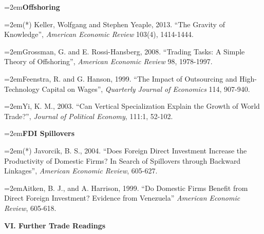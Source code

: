 \documentclass[10pt]{article}
\newcommand{\reading}{\par\hangindent=2em\hangafter=1\noindent}
\newenvironment{readingsblock}{%
  \begin{adjustwidth}{2em}{0pt} %
}{%
  \end{adjustwidth}
}
\begin{document}
\begin{readingsblock}
  \reading \textbf{Offshoring} \\[4pt]
  
  \reading (*) Keller, Wolfgang and Stephen Yeaple, 2013. “The Gravity of Knowledge”, {\it American Economic Review} 103(4), 1414-1444.
  \reading Grossman, G. and E. Rossi-Hansberg, 2008. “Trading Tasks: A Simple Theory of Offshoring”, {\it American Economic Review} 98, 1978-1997.
  \reading Feenstra, R. and G. Hanson, 1999. “The Impact of Outsourcing and High-Technology Capital on Wages”, {\it Quarterly Journal of Economics} 114, 907-940.
  \reading Yi, K. M., 2003. “Can Vertical Specialization Explain the Growth of World Trade?”, {\it Journal of Political Economy}, 111:1, 52-102. \\[4pt]
  
  
  \reading \textbf{FDI Spillovers} \\[4pt]
  
  \reading (*) Javorcik, B. S., 2004. “Does Foreign Direct Investment Increase the Productivity of Domestic Firms? In Search of Spillovers through Backward Linkages”, {\it American Economic Review}, 605-627.
  \reading Aitken, B. J., and A. Harrison, 1999. “Do Domestic Firms Benefit from Direct Foreign Investment? Evidence from Venezuela” {\it American Economic Review}, 605-618. \\[4pt]
  
  \end{readingsblock}
  
  
\noindent \textbf{VI. Further Trade Readings} \\[6pt]
\end{document}
